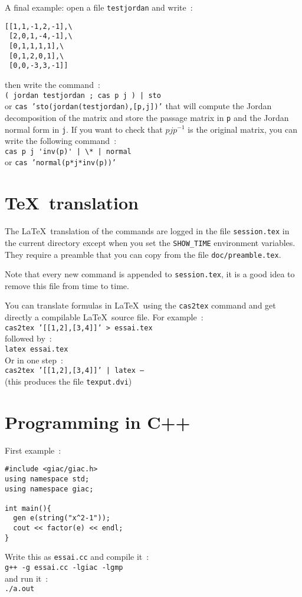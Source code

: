 \documentclass{article}
\begin{document}
A final example: open a file {\tt testjordan} and write~:
\begin{verbatim}
[[1,1,-1,2,-1],\
 [2,0,1,-4,-1],\
 [0,1,1,1,1],\
 [0,1,2,0,1],\
 [0,0,-3,3,-1]]
\end{verbatim}
then write the command~:\\
{\tt ( jordan testjordan ; cas p j ) | sto }\\
or {\tt cas 'sto(jordan(testjordan),[p,j])'}
that will compute the Jordan decomposition of the matrix and store the
passage matrix in {\tt p} and the Jordan normal form in {\tt j}.
If you want to check that $p j p^{-1}$ is the original matrix,
you can write the following command~:\\
\verb?cas p j 'inv(p)' | \* | normal ?\\
or {\tt cas 'normal(p*j*inv(p))'}

\section{\TeX\ translation}
The \LaTeX\ translation of the commands are logged in the file 
{\tt session.tex} in the current directory except when you set the
\verb|SHOW_TIME| environment variables. They require a preamble that
you can copy from the file {\tt doc/preamble.tex}.

Note that every new command is appended to {\tt session.tex}, it is
a good idea to remove this file from time to time.

You can translate formulas in \LaTeX\ using the {\tt cas2tex} command
and get directly a compilable \LaTeX\ source file.
For example~:\\
{\tt cas2tex '[[1,2],[3,4]]' > essai.tex}\\
followed by~:\\
{\tt latex essai.tex}\\
Or in one step~:\\
{\tt cas2tex '[[1,2],[3,4]]' | latex --}\\
(this produces the file {\tt texput.dvi})

\section{Programming in C++}
First example~:
\begin{verbatim}
#include <giac/giac.h>
using namespace std;
using namespace giac;

int main(){
  gen e(string("x^2-1"));
  cout << factor(e) << endl;
}
\end{verbatim}
Write this as {\tt essai.cc} and compile it~:\\
{\tt g++ -g essai.cc -lgiac -lgmp}\\
and run it~:\\
{\tt ./a.out}
\end{document}
